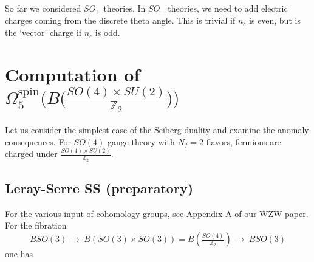 \documentclass[12pt]{article}
\numberwithin{equation}{section}
\def\bZ{\mathbb{Z}}
\begin{document}
So far we considered $SO_+$ theories. 
In $SO_-$ theories, we need to add electric charges coming from the discrete theta angle.
This is trivial if $n_c$ is even, but is the `vector' charge if $n_c$ is odd.



\appendix

\section{Computation of $\Omega_5^{\mathrm{spin}}\big(
	B\big(
		\tfrac{SO(4)\times SU(2)}{\bZ_2}
	\big)
\big)$}

Let us consider the simplest case of the Seiberg duality and examine the anomaly consequences.
For $SO(4)$ gauge theory with $N_f=2$ flavors, fermions are charged under $\tfrac{SO(4)\times SU(2)}{\bZ_2}$.
\subsection{Leray-Serre SS (preparatory)}
For the various input of cohomology groups, see Appendix A of our WZW paper.
For the fibration
\begin{equation}
	BSO(3)
	\ \to\ 
	B\left(SO(3)\times SO(3)\right)
	=
	B\left(\tfrac{SO(4)}{\bZ_2}\right)
	\ \to\ 
	BSO(3)
\end{equation}
one has
\end{document}
